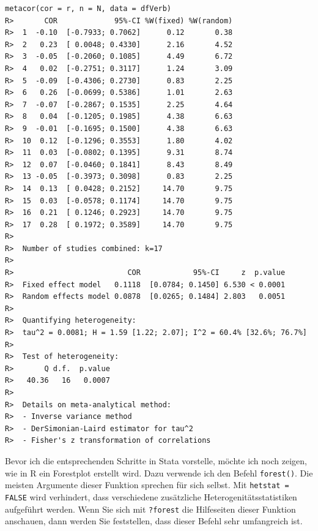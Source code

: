 \documentclass[normalheadings, 10pt]{scrartcl}\usepackage{graphicx, color}
\makeatletter
\newenvironment{kframe}{%
 \def\at@end@of@kframe{}%
 \ifinner\ifhmode%
  \def\at@end@of@kframe{\end{minipage}}%
  \begin{minipage}{\columnwidth}%
 \fi\fi%
 \def\FrameCommand##1{\hskip\@totalleftmargin \hskip-\fboxsep
 \colorbox{shadecolor}{##1}\hskip-\fboxsep
     \hskip-\linewidth \hskip-\@totalleftmargin \hskip\columnwidth}%
 \MakeFramed {\advance\hsize-\width
   \@totalleftmargin\z@ \linewidth\hsize
   \@setminipage}}%
 {\par\unskip\endMakeFramed%
 \at@end@of@kframe}
\newenvironment{knitrout}{}{} %
\newcommand{\code}[1]{\texttt{#1}}
\makeatother
\begin{document}
\begin{rbsp}
\begin{knitrout}
\color{fgcolor}\begin{kframe}
\begin{verbatim}
metacor(cor = r, n = N, data = dfVerb)
R>       COR             95%-CI %W(fixed) %W(random)
R>  1  -0.10  [-0.7933; 0.7062]      0.12       0.38
R>  2   0.23  [ 0.0048; 0.4330]      2.16       4.52
R>  3  -0.05  [-0.2060; 0.1085]      4.49       6.72
R>  4   0.02  [-0.2751; 0.3117]      1.24       3.09
R>  5  -0.09  [-0.4306; 0.2730]      0.83       2.25
R>  6   0.26  [-0.0699; 0.5386]      1.01       2.63
R>  7  -0.07  [-0.2867; 0.1535]      2.25       4.64
R>  8   0.04  [-0.1205; 0.1985]      4.38       6.63
R>  9  -0.01  [-0.1695; 0.1500]      4.38       6.63
R>  10  0.12  [-0.1296; 0.3553]      1.80       4.02
R>  11  0.03  [-0.0802; 0.1395]      9.31       8.74
R>  12  0.07  [-0.0460; 0.1841]      8.43       8.49
R>  13 -0.05  [-0.3973; 0.3098]      0.83       2.25
R>  14  0.13  [ 0.0428; 0.2152]     14.70       9.75
R>  15  0.03  [-0.0578; 0.1174]     14.70       9.75
R>  16  0.21  [ 0.1246; 0.2923]     14.70       9.75
R>  17  0.28  [ 0.1972; 0.3589]     14.70       9.75
R>  
R>  Number of studies combined: k=17
R>  
R>                          COR            95%-CI     z  p.value
R>  Fixed effect model   0.1118  [0.0784; 0.1450] 6.530 < 0.0001
R>  Random effects model 0.0878  [0.0265; 0.1484] 2.803   0.0051
R>  
R>  Quantifying heterogeneity:
R>  tau^2 = 0.0081; H = 1.59 [1.22; 2.07]; I^2 = 60.4% [32.6%; 76.7%]
R>  
R>  Test of heterogeneity:
R>       Q d.f.  p.value
R>   40.36   16   0.0007
R>  
R>  Details on meta-analytical method:
R>  - Inverse variance method
R>  - DerSimonian-Laird estimator for tau^2
R>  - Fisher's z transformation of correlations
\end{verbatim}
\end{kframe}
\end{knitrout}

\end{rbsp}

Bevor ich die entsprechenden Schritte in Stata vorstelle, möchte ich noch zeigen,
wie in R ein Forestplot erstellt wird. Dazu verwende ich den Befehl
\code{forest()}. Die meisten Argumente dieser Funktion sprechen für sich
selbst. Mit \code{hetstat = FALSE} wird verhindert, dass verschiedene
zusätzliche Heterogenitätsstatistiken aufgeführt werden. Wenn Sie sich mit
\code{?forest} die Hilfeseiten dieser Funktion anschauen, dann werden Sie
feststellen, dass dieser Befehl sehr umfangreich ist.
\end{document}
